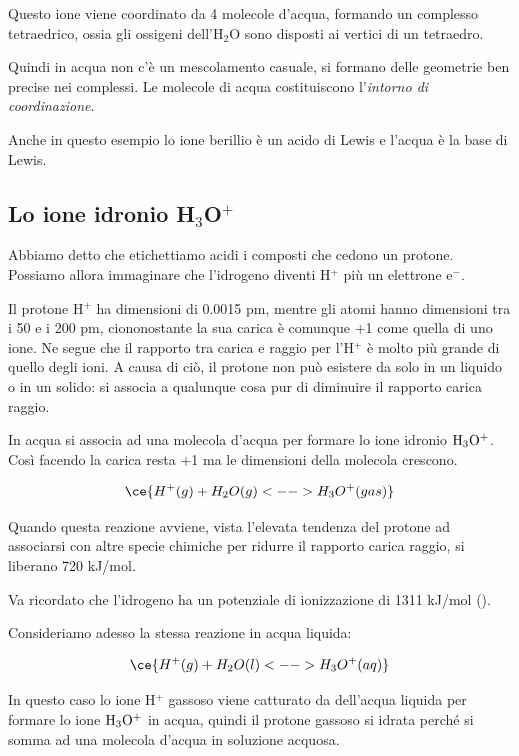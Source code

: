 Questo ione viene coordinato da 4 molecole d'acqua, formando un complesso tetraedrico, ossia gli ossigeni dell'H$_2$O sono disposti ai vertici di un tetraedro.

Quindi in acqua non c'è un mescolamento casuale, si formano delle geometrie ben precise nei complessi. Le molecole di acqua costituiscono l'\textit{intorno di coordinazione}.

Anche in questo esempio lo ione berillio è un acido di Lewis e l'acqua è la base di Lewis.

\subsection{Lo ione idronio H\texorpdfstring{$_3$}{\textthreeinferior}O\texorpdfstring{$^+$}{\textplussuperior}}
Abbiamo detto che etichettiamo acidi i composti che cedono un protone. Possiamo allora immaginare che l'idrogeno diventi H$^+$ più un elettrone e$^-$.

Il protone H$^+$ ha dimensioni di 0.0015 pm, mentre gli atomi hanno dimensioni tra i 50 e i 200 pm, ciononostante la sua carica è comunque +1 come quella di uno ione. Ne segue che il rapporto tra carica e raggio per l'H$^+$ è molto più grande di quello degli ioni. A causa di ciò, il protone non può esistere da solo in un liquido o in un solido: si associa a qualunque cosa pur di diminuire il rapporto carica raggio.

In acqua si associa ad una molecola d'acqua per formare lo ione idronio $\rm H_3O^+$. Così facendo la carica resta +1 ma le dimensioni della molecola crescono.

$$\ce{H^+(g) + H_2O(g) <--> H_3O^+(gas)}$$

Quando questa reazione avviene, vista l'elevata tendenza del protone ad associarsi con altre specie chimiche per ridurre il rapporto carica raggio, si liberano 720 kJ/mol.

Va ricordato che l'idrogeno ha un potenziale di ionizzazione di 1311 kJ/mol ().

\vspace{0.2cm}Consideriamo adesso la stessa reazione in acqua liquida:

$$\ce{H^+(g) + H_2O(l) <--> H_3O^+(aq)}$$

In questo caso lo ione H$^+$ gassoso viene catturato da dell'acqua liquida per formare lo ione $\rm H_3O^+$ in acqua, quindi il protone gassoso si idrata perché si somma ad una molecola d'acqua in soluzione acquosa.

